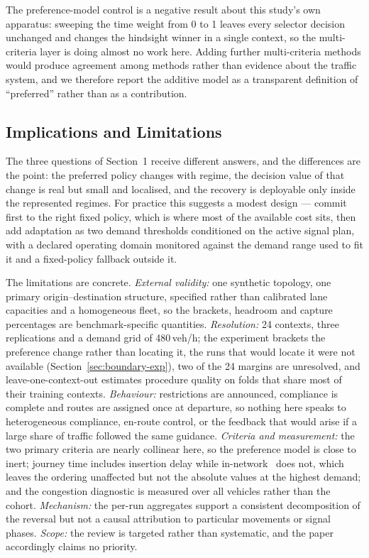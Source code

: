 The preference-model control is a negative result about this study's own apparatus:
sweeping the time weight from 0 to 1 leaves every selector decision unchanged and changes
the hindsight winner in a single context, so the multi-criteria layer is doing almost no
work here. Adding further multi-criteria methods would produce agreement among methods
rather than evidence about the traffic system, and we therefore report the additive model
as a transparent definition of ``preferred'' rather than as a contribution.

\subsection{Implications and Limitations}

The three questions of Section~1 receive different answers, and the differences are the
point: the preferred policy changes with regime, the decision value of that change is real
but small and localised, and the recovery is deployable only inside the represented
regimes. For practice this suggests a modest design --- commit first to the right fixed
policy, which is where most of the available cost sits, then add adaptation as two demand
thresholds conditioned on the active signal plan, with a declared operating domain
monitored against the demand range used to fit it and a fixed-policy fallback outside it.

The limitations are concrete. \emph{External validity:} one synthetic topology, one primary
origin--destination structure, specified rather than calibrated lane capacities and a
homogeneous fleet, so the brackets, headroom and capture percentages are benchmark-specific
quantities. \emph{Resolution:} 24 contexts, three replications and a demand grid of
480\,veh/h; the experiment brackets the preference change rather than locating it, the runs
that would locate it were not available (Section~\ref{sec:boundary-exp}), two of the 24
margins are unresolved, and leave-one-context-out estimates procedure quality on folds that
share most of their training contexts. \emph{Behaviour:} restrictions are announced,
compliance is complete and routes are assigned once at departure, so nothing here speaks to
heterogeneous compliance, en-route control, or the feedback that would arise if a large
share of traffic followed the same guidance. \emph{Criteria and measurement:} the two
primary criteria are nearly collinear here, so the preference model is close to inert;
journey time includes insertion delay while in-network \CO\ does not, which leaves the
ordering unaffected but not the absolute values at the highest demand; and the congestion
diagnostic is measured over all vehicles rather than the cohort. \emph{Mechanism:} the
per-run aggregates support a consistent decomposition of the reversal but not a causal
attribution to particular movements or signal phases. \emph{Scope:} the review is targeted
rather than systematic, and the paper accordingly claims no priority.

